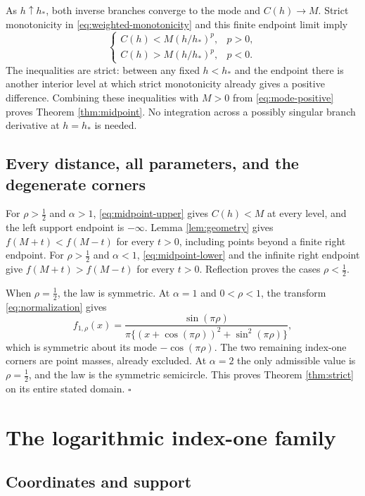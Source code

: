\documentclass[11pt,a4paper]{article}
\theoremstyle{definition}
\theoremstyle{remark}
\numberwithin{equation}{section}
\newcommand{\hp}{h_\ast}
\begin{document}
As $h\uparrow\hp$, both inverse branches converge to the mode and
$C(h)\to M$. Strict monotonicity in \eqref{eq:weighted-monotonicity}
and this finite endpoint limit imply
\[
 \begin{cases}
 C(h)<M(h/\hp)^p,&p>0,\\
 C(h)>M(h/\hp)^p,&p<0.
 \end{cases}
\]
The inequalities are strict: between any fixed $h<\hp$ and the
endpoint there is another interior level at which strict monotonicity
already gives a positive difference.
Combining these inequalities with $M>0$ from
\eqref{eq:mode-positive} proves Theorem \ref{thm:midpoint}.
No integration across a possibly singular branch derivative at
$h=\hp$ is needed.

\subsection{Every distance, all parameters, and the degenerate corners}

For $\rho>\tfrac12$ and $\alpha>1$, \eqref{eq:midpoint-upper} gives
$C(h)<M$ at every level, and the left support endpoint is $-\infty$.
Lemma \ref{lem:geometry} gives
$f(M+t)<f(M-t)$ for every $t>0$, including points beyond a finite
right endpoint. For $\rho>\tfrac12$ and $\alpha<1$,
\eqref{eq:midpoint-lower} and the infinite right endpoint give
$f(M+t)>f(M-t)$ for every $t>0$. Reflection proves the cases
$\rho<\tfrac12$.

When $\rho=\tfrac12$, the law is symmetric. At $\alpha=1$ and
$0<\rho<1$, the transform \eqref{eq:normalization} gives
\[
 f_{1,\rho}(x)=
 \frac{\sin(\pi\rho)}
 {\pi\{(x+\cos(\pi\rho))^2+\sin^2(\pi\rho)\}},
\]
which is symmetric about its mode $-\cos(\pi\rho)$.
The two remaining index-one corners are point masses, already
excluded. At $\alpha=2$ the only admissible value is $\rho=\tfrac12$,
and the law is the symmetric semicircle. This proves
Theorem \ref{thm:strict} on its entire stated domain.
\hfill$\square$

\section{The logarithmic index-one family}
\label{sec:log-proof}

\subsection{Coordinates and support}
\end{document}
